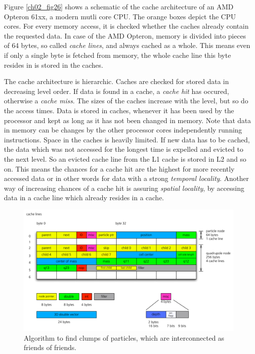 Figure \ref{ch02_fig26} shows a schematic of the cache architecture of an AMD Opteron 61xx, a modern mutli core CPU. The orange boxes depict the CPU cores. For every memory access, it is checked whether the caches already contain the requested data. In case of the AMD Opteron, memory is divided into pieces of 64 bytes, so called \emph{cache lines}, and always cached as a whole. This means even if only a single byte is fetched from memory, the whole cache line this byte resides in is stored in the caches.

The cache architecture is hierarchic. Caches are checked for stored data in decreasing level order. If data is found in a cache, a \emph{cache hit} has occured, otherwise a \emph{cache miss}. The sizes of the caches increase with the level, but so do the access times. Data is stored in caches, whenever it has been used by the processor and kept as long as it has not been changed in memory. Note that data in memory can be changes by the other processor cores independently running instructions. Space in the caches is heavily limited. If new data has to be cached, the data which was not accessed for the longest time is expelled and evicted to the next level. So an evicted cache line from the L1 cache is stored in L2 and so on. This means the chances for a cache hit are the highest for more recently accessed data or in other words for data with a strong \emph{temporal locality}. Another way of increasing chances of a cache hit is assuring \emph{spatial locality}, by accessing data in a cache line which already resides in a cache. 







\begin{figure}[htbp]
\begin{center}
\includegraphics[scale=0.6]{28algo_cells.pdf}
\caption{Algorithm to find clumps of particles, which are interconnected as friends of friends.}
\label{ch02_fig28}
\end{center}
\end{figure}


